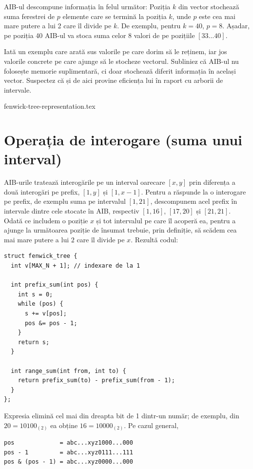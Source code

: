 \documentclass[../main.tex]{subfiles}
\begin{document}
AIB-ul descompune informația în felul următor: Poziția $k$ din vector stochează suma ferestrei de $p$ elemente care se termină la poziția $k$, unde $p$ este cea mai mare putere a lui 2 care îl divide pe $k$. De exemplu, pentru $k = 40$, $p = 8$. Așadar, pe poziția 40 AIB-ul va stoca suma celor 8 valori de pe pozițiile $[33 \dots 40]$.

Iată un exemplu care arată sus valorile pe care dorim să le reținem, iar jos valorile concrete pe care ajunge să le stocheze vectorul. Subliniez că AIB-ul nu folosește memorie suplimentară, ci doar stochează diferit informația în același vector. Suspectez că și de aici provine eficiența lui în raport cu arborii de intervale.

{fenwick-tree-representation.tex}

\section{Operația de interogare (suma unui interval)}

AIB-urile tratează interogările pe un interval oarecare $[x, y]$ prin diferența a două interogări pe prefix, $[1, y]$ și $[1, x - 1]$. Pentru a răspunde la o interogare pe prefix, de exemplu suma pe intervalul $[1, 21]$, descompunem acel prefix în intervale dintre cele stocate în AIB, respectiv $[1,16]$, $[17, 20]$ și $[21, 21]$. Odată ce includem o poziție $x$ și tot intervalul pe care îl acoperă ea, pentru a ajunge la următoarea poziție de însumat trebuie, prin definiție, să scădem cea mai mare putere a lui $2$ care îl divide pe $x$. Rezultă codul:

\begin{verbatim}
struct fenwick_tree {
  int v[MAX_N + 1]; // indexare de la 1

  int prefix_sum(int pos) {
    int s = 0;
    while (pos) {
      s += v[pos];
      pos &= pos - 1;
    }
    return s;
  }

  int range_sum(int from, int to) {
    return prefix_sum(to) - prefix_sum(from - 1);
  }
};
\end{verbatim}

Expresia  elimină cel mai din dreapta bit de 1 dintr-un număr; de exemplu, din $20 = 10100_{(2)}$ ea obține $16 = 10000_{(2)}$. Pe cazul general,

\begin{verbatim}
pos             = abc...xyz1000...000
pos - 1         = abc...xyz0111...111
pos & (pos - 1) = abc...xyz0000...000
\end{verbatim}
\end{document}

